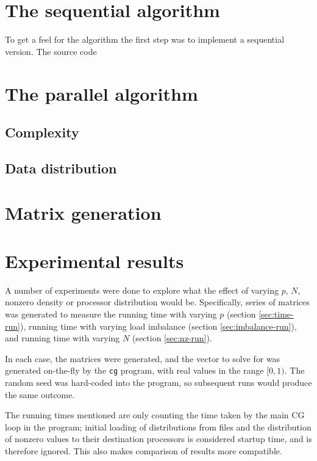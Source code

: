 \documentclass[a4paper]{article}
\begin{document}
\section{The sequential algorithm}

To get a feel for the algorithm the first step was to implement a sequential version. The source code 

\section{The parallel algorithm}

\subsection{Complexity}

\subsection{Data distribution}

\section{Matrix generation}\label{sec:matrix-generation}


\section{Experimental results}

A number of experiments were done to explore what the effect of varying $p$,
$N$, nonzero density or processor distribution would be. Specifically, series
of matrices was generated to measure the running time with varying $p$ (section
\ref{sec:time-run}), running time with varying load imbalance (section
\ref{sec:imbalance-run}), and running time with varying $N$ (section
\ref{sec:nz-run}).

In each case, the matrices were generated, and the vector to solve for
was generated on-the-fly by the \texttt{cg} program, with real values
in the range $[0,1)$. The random seed was hard-coded into the program,
    so subsequent runs would produce the same outcome.

The running times mentioned are only counting the time taken by the main CG loop
in the program; initial loading of distributions from files and the distribution of
nonzero values to their destination processors is considered startup time, and is therefore
ignored. This also makes comparison of results more compatible.
\end{document}
